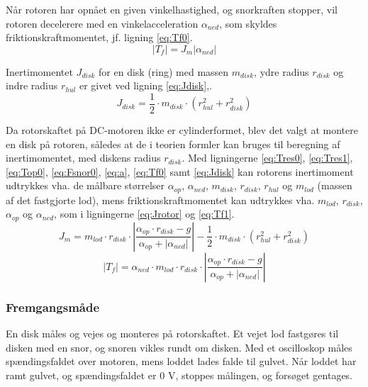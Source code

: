 Når rotoren har opnået en given vinkelhastighed, og snorkraften stopper,
vil rotoren decelerere med en vinkelacceleration \(\alpha_{ned}\), som skyldes friktionskraftmomentet,
jf. ligning \ref{eq:Tf0}.
\begin{equation}
	\left|T_f\right|=J_m\left|\alpha_{ned}\right|
	\label{eq:Tf0}
 \end{equation}

Inertimomentet \(J_{disk}\) for en disk (ring) med massen \(m_{disk}\), ydre radius \(r_{disk}\) og
indre radius \(r_{hul}\) er givet ved ligning \ref{eq:Jdisk},\citep[Side. 255, tabel 10-2b]{fund_of_physics}.
\begin{equation}
	J_{disk}=\frac{1}{2}\cdot{m_{disk}}\cdot\left(r_{hul}^2+r_{disk}^2\right)
	\label{eq:Jdisk}
 \end{equation}

Da rotorskaftet på DC-motoren ikke er cylinderformet, blev det valgt at montere en disk
på rotoren, således at de i teorien formler kan bruges til beregning af inertimomentet,
med diskens radius \(r_{disk}\).
Med ligningerne \ref{eq:Tres0}, \ref{eq:Tres1}, \ref{eq:Top0}, \ref{eq:Fsnor0}, \ref{eq:a}, \ref{eq:Tf0} samt \ref{eq:Jdisk}
kan rotorens inertimoment udtrykkes vha. de målbare størrelser
\(\alpha_{op}\), \(\alpha_{ned}\), \(m_{disk}\), \(r_{disk}\), \(r_{hul}\) og \(m_{lod}\) (massen af det fastgjorte lod),
mens friktionskraftmomentet kan udtrykkes vha. \(m_{lod}\), \(r_{disk}\), \(\alpha_{op}\) og \(\alpha_{ned}\),
som i ligningerne \ref{eq:Jrotor} og \ref{eq:Tf1}.
\begin{equation}
J_{ m }=m_{ lod }\cdot { r_{ disk } }\cdot \left| \frac { \alpha _{ op }\cdot { r_{ disk } }-g }{ \alpha _{ op }+\left| \alpha _{ ned } \right|  }  \right| -\frac { 1 }{ 2 } \cdot { m_{ disk } }\cdot \left( r_{ hul }^{ 2 }+r_{ disk }^{ 2 } \right) 
	\label{eq:Jrotor}
\end{equation}
\begin{equation}
\left| T_{ f } \right| =\alpha _{ ned }\cdot { m_{ lod } }\cdot { r_{ disk } }\cdot \left| \frac { \alpha _{ op }\cdot { r_{ disk } }-g }{ \alpha _{ op }+\left| \alpha _{ ned } \right|  }  \right| 
	\label{eq:Tf1}
 \end{equation}
\subsubsection{Fremgangsmåde}
En disk måles og vejes og monteres på rotorskaftet.
Et vejet lod fastgøres til disken med en snor, og snoren vikles rundt om disken.
Med et oscilloskop måles spændingsfaldet over motoren, mens loddet lades falde til gulvet.
Når loddet har ramt gulvet, og spændingsfaldet er 0 V, stoppes målingen, og forsøget gentages.
